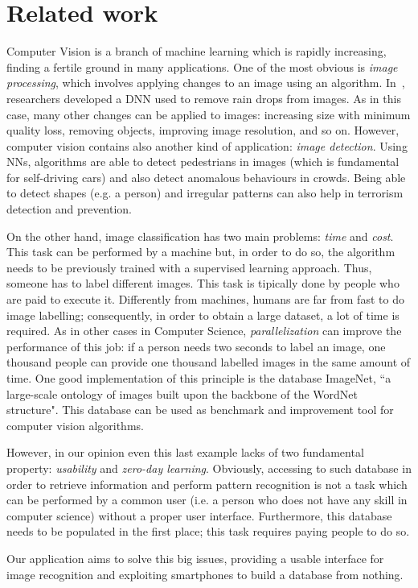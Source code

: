 \section{Related work}
\label{sec:related}

Computer Vision is a branch of machine learning which is rapidly increasing, finding a fertile ground in many applications. One of the most obvious is \textit{image processing}, which involves applying changes to an image using an algorithm. In~\cite{Rain}, researchers developed a DNN used to remove rain drops from images. As in this case, many other changes can be applied to images: increasing size with minimum quality loss, removing objects, improving image resolution, and so on. However, computer vision contains also another kind of application: \textit{image detection}. Using NNs, algorithms are able to detect pedestrians in images\cite{Pedestrian} (which is fundamental for self-driving cars) and also detect anomalous behaviours in crowds\cite{Crowd}. Being able to detect shapes (e.g. a person) and irregular patterns can also help in terrorism detection and prevention.

On the other hand, image classification has two main problems: \textit{time} and \textit{cost}. This task can be performed by a machine but, in order to do so, the algorithm needs to be previously trained with a supervised learning approach. Thus, someone has to label different images. This task is tipically done by people who are paid to execute it. Differently from machines, humans are far from fast to do image labelling; consequently, in order to obtain a large dataset, a lot of time is required.
As in other cases in Computer Science, \textit{parallelization} can improve the performance of this job: if a person needs two seconds to label an image, one thousand people can provide one thousand labelled images in the same amount of time. One good implementation of this principle is the database ImageNet\cite{ImageNet2}, ``a large-scale ontology of images built upon the backbone of the WordNet structure"\cite{ImageNet1}. This database can be used as benchmark and improvement tool for computer vision algorithms.

However, in our opinion even this last example lacks of two fundamental property: \textit{usability} and \textit{zero-day learning}. Obviously, accessing to such database in order to retrieve information and perform pattern recognition is not a task which can be performed by a common user (i.e. a person who does not have any skill in computer science) without a proper user interface. Furthermore, this database needs to be populated in the first place; this task requires paying people to do so.

Our application aims to solve this big issues, providing a usable interface for image recognition and exploiting smartphones to build a database from nothing.

